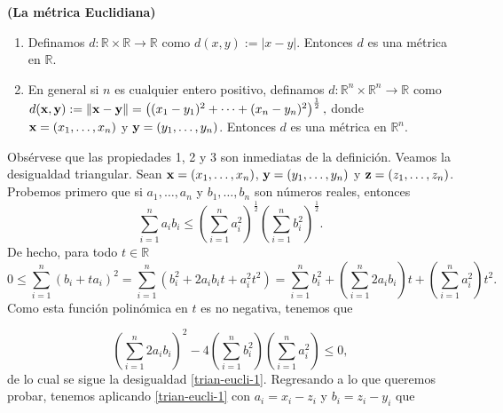 \begin{example}\textbf{(La métrica Euclidiana)}
\begin{enumerate}
    \item Definamos $d: \mathbb{R}\times \mathbb{R} \to \mathbb{R}$ como $d(x,y):= |x-y|.$ Entonces $d$ es una métrica en $\mathbb{R}$.
    \item En general si $n$ es cualquier  entero positivo, definamos $d: \mathbb{R}^n\times \mathbb{R}^n \to \mathbb{R}$ como \linebreak $d(\mathbf{x},\mathbf{y}):= \|\mathbf{x}-\mathbf{y} \|=\left( (x_1-y_1)^2+\cdots + (x_n-y_n)^2\right)^{\frac{1}2},$ donde $\mathbf{x}=(x_1, \dots ,x_n)$ y $\mathbf{y}=(y_1, \dots ,y_n)$. Entonces $d$ es una métrica en $\mathbb{R}^n$.
\end{enumerate}
\end{example}
Obsérvese que las propiedades 1, 2 y 3
 son inmediatas de la definición. Veamos la desigualdad triangular. Sean $\mathbf{x}=(x_1, \dots ,x_n)$, $\mathbf{y}=(y_1, \dots ,y_n)$ y $\mathbf{z}=(z_1, \dots ,z_n)$. Probemos primero que si $a_1, \dots , a_n$ y $b_1, \dots , b_n$ son números reales, entonces
\begin{equation}\label{trian-eucli-1}
     \sum_{i=1}^na_ib_i \leq \left( \sum_{i=1}^na_i^2\right)^{\frac{1}{2}}\left( \sum_{i=1}^nb_i^2\right)^{\frac{1}{2}} .
 \end{equation}
De hecho, para todo $t\in \mathbb{R}$
\[0\leq \sum_{i=1}^n \left(b_i+ta_i\right)^2=\sum_{i=1}^n \left(b_i^2+2a_ib_it+a_i^2t^2\right)=\sum_{i=1}^n b_i^2+ \left(\sum_{i=1}^n 2a_ib_i\right)t+\left(\sum_{i=1}^n a_i^2\right)t^2.\]
Como esta función polinómica en $t$ es no negativa, tenemos que

\[\left(\sum_{i=1}^n 2a_ib_i\right)^2-4\left(\sum_{i=1}^n b_i^2\right)\left(\sum_{i=1}^n a_i^2\right) \leq 0,\]
de lo cual se sigue la desigualdad \eqref{trian-eucli-1}. Regresando a lo que queremos probar, tenemos aplicando \eqref{trian-eucli-1} con $a_i=x_i-z_i$ y $b_i=z_i-y_i$ que


